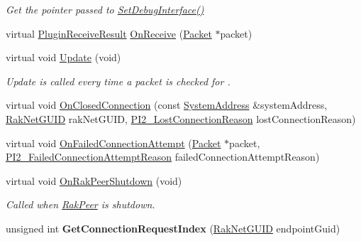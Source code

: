 \begin{DoxyCompactItemize}
\begin{DoxyCompactList}\small\item\em Get the pointer passed to \hyperlink{class_rak_net_1_1_router2_ada3cd3f17fadd1466d0ad0ed693fbf69}{Set\-Debug\-Interface()} \end{DoxyCompactList}\item 
virtual \hyperlink{group___p_l_u_g_i_n___i_n_t_e_r_f_a_c_e___g_r_o_u_p_ga89998adaafb29e5d879113b992161085}{Plugin\-Receive\-Result} \hyperlink{class_rak_net_1_1_router2_a825d62c2f01def72c58815b609cf4bbf}{On\-Receive} (\hyperlink{struct_rak_net_1_1_packet}{Packet} $\ast$packet)
\item 
\hypertarget{class_rak_net_1_1_router2_a6d06f99cdd31fabd9e0dc1f0e19d0f39}{virtual void \hyperlink{class_rak_net_1_1_router2_a6d06f99cdd31fabd9e0dc1f0e19d0f39}{Update} (void)}\label{class_rak_net_1_1_router2_a6d06f99cdd31fabd9e0dc1f0e19d0f39}

\begin{DoxyCompactList}\small\item\em Update is called every time a packet is checked for . \end{DoxyCompactList}\item 
virtual void \hyperlink{class_rak_net_1_1_router2_a428635762452b03a115043e4628837b9}{On\-Closed\-Connection} (const \hyperlink{struct_rak_net_1_1_system_address}{System\-Address} \&system\-Address, \hyperlink{struct_rak_net_1_1_rak_net_g_u_i_d}{Rak\-Net\-G\-U\-I\-D} rak\-Net\-G\-U\-I\-D, \hyperlink{group___p_l_u_g_i_n___i_n_t_e_r_f_a_c_e___g_r_o_u_p_ga376cc546fd6892c2ead48cd51796c8b8}{P\-I2\-\_\-\-Lost\-Connection\-Reason} lost\-Connection\-Reason)
\item 
virtual void \hyperlink{class_rak_net_1_1_router2_ac3be692d08e4ccce030c201038346f1d}{On\-Failed\-Connection\-Attempt} (\hyperlink{struct_rak_net_1_1_packet}{Packet} $\ast$packet, \hyperlink{group___p_l_u_g_i_n___i_n_t_e_r_f_a_c_e___g_r_o_u_p_ga3e92f686bace869b78c10508c58e0825}{P\-I2\-\_\-\-Failed\-Connection\-Attempt\-Reason} failed\-Connection\-Attempt\-Reason)
\item 
\hypertarget{class_rak_net_1_1_router2_a59bb4fa9ae67bdc0c3761c2bd5bce6b7}{virtual void \hyperlink{class_rak_net_1_1_router2_a59bb4fa9ae67bdc0c3761c2bd5bce6b7}{On\-Rak\-Peer\-Shutdown} (void)}\label{class_rak_net_1_1_router2_a59bb4fa9ae67bdc0c3761c2bd5bce6b7}

\begin{DoxyCompactList}\small\item\em Called when \hyperlink{class_rak_net_1_1_rak_peer}{Rak\-Peer} is shutdown. \end{DoxyCompactList}\item 
\hypertarget{class_rak_net_1_1_router2_aca4ac55a38bf9d85f1f1719da91876ce}{unsigned int {\bfseries Get\-Connection\-Request\-Index} (\hyperlink{struct_rak_net_1_1_rak_net_g_u_i_d}{Rak\-Net\-G\-U\-I\-D} endpoint\-Guid)}\label{class_rak_net_1_1_router2_aca4ac55a38bf9d85f1f1719da91876ce}

\end{DoxyCompactItemize}

